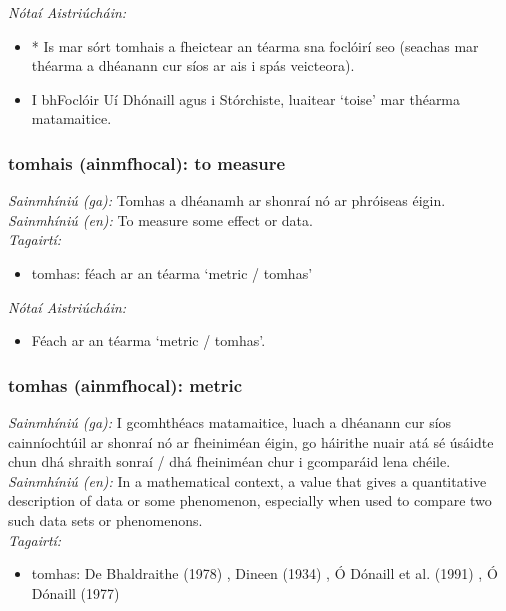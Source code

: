  \noindent \textit{Nótaí Aistriúcháin:}
\begin{itemize}
	\item * Is mar sórt tomhais a fheictear an téarma sna foclóirí seo (seachas mar théarma a dhéanann cur síos ar ais i spás veicteora).
	\item I bhFoclóir Uí Dhónaill agus i Stórchiste, luaitear `toise' mar théarma matamaitice.
\end{itemize}


\subsubsection*{tomhais (ainmfhocal): to measure}
 \noindent \textit{Sainmhíniú (ga):} Tomhas a dhéanamh ar shonraí nó ar phróiseas éigin.
\\
 \noindent \textit{Sainmhíniú (en):} To measure some effect or data.
\\
 \noindent \textit{Tagairtí:}
\begin{itemize}
	\item tomhas: féach ar an téarma `metric / tomhas'
\end{itemize}

 \noindent \textit{Nótaí Aistriúcháin:}
\begin{itemize}
	\item Féach ar an téarma `metric / tomhas'.
\end{itemize}


\subsubsection*{tomhas (ainmfhocal): metric}
 \noindent \textit{Sainmhíniú (ga):} I gcomhthéacs matamaitice, luach a dhéanann cur síos cainníochtúil ar shonraí nó ar fheiniméan éigin, go háirithe nuair atá sé úsáidte chun dhá shraith sonraí / dhá fheiniméan chur i gcomparáid lena chéile.
\\
 \noindent \textit{Sainmhíniú (en):} In a mathematical context, a value that gives a quantitative description of data or some phenomenon, especially when used to compare two such data sets or phenomenons.
\\
 \noindent \textit{Tagairtí:}
\begin{itemize}
	\item tomhas: De Bhaldraithe (1978) \cite{de-bhaldraithe}, Dineen (1934) \cite{dineen}, Ó Dónaill et al. (1991) \cite{focloir-beag}, Ó Dónaill (1977) \cite{odonaill}
\end{itemize}


